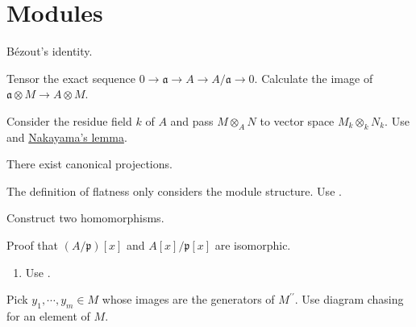 \section{Modules}

\begin{exercise}\label{ex2.1}
	B\'{e}zout's identity.
\end{exercise}

\begin{exercise}\label{ex2.2}
	Tensor the exact sequence $0\rightarrow\mathfrak{a}\rightarrow A\rightarrow A/\mathfrak{a}\rightarrow0$. Calculate the image of  $\mathfrak{a}\otimes M\rightarrow A\otimes M$.
\end{exercise}

\begin{exercise}\label{ex2.3}
	Consider the residue field $k$ of $A$ and pass $M\otimes_AN$ to vector space $M_k\otimes_kN_k$. Use  and \hyperref[2.6]{Nakayama's lemma}.
\end{exercise}

\begin{exercise}\label{ex2.4}
	There exist canonical projections.
\end{exercise}

\begin{exercise}\label{ex2.5}
	The definition of flatness only considers the module structure. Use .
\end{exercise}

\begin{exercise}\label{ex2.6}
	Construct two homomorphisms.
\end{exercise}

\begin{exercise}\label{ex2.7}
	Proof that $(A/\mathfrak{p})[x]$ and $A[x]/\mathfrak{p}[x]$ are isomorphic.
\end{exercise}

\begin{exercise}\label{ex2.8}
	\begin{enumerate}
		\item[(ii)] Use .
	\end{enumerate}
\end{exercise}

\begin{exercise}\label{ex2.9}
	Pick $y_1,\cdots,y_m\in M$ whose images are the generators of $M^{\prime\prime}$. Use diagram chasing for an element of $M$. 
\end{exercise}

